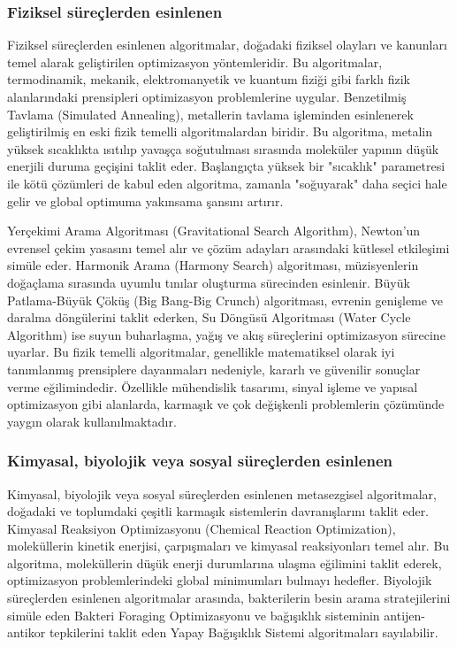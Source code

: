 \subsubsection{Fiziksel süreçlerden esinlenen}

Fiziksel süreçlerden esinlenen algoritmalar, doğadaki fiziksel olayları ve kanunları temel alarak geliştirilen optimizasyon yöntemleridir. Bu algoritmalar, termodinamik, mekanik, elektromanyetik ve kuantum fiziği gibi farklı fizik alanlarındaki prensipleri optimizasyon problemlerine uygular. Benzetilmiş Tavlama (Simulated Annealing), metallerin tavlama işleminden esinlenerek geliştirilmiş en eski fizik temelli algoritmalardan biridir. Bu algoritma, metalin yüksek sıcaklıkta ısıtılıp yavaşça soğutulması sırasında moleküler yapının düşük enerjili duruma geçişini taklit eder. Başlangıçta yüksek bir "sıcaklık" parametresi ile kötü çözümleri de kabul eden algoritma, zamanla "soğuyarak" daha seçici hale gelir ve global optimuma yakınsama şansını artırır.

Yerçekimi Arama Algoritması (Gravitational Search Algorithm), Newton'un evrensel çekim yasasını temel alır ve çözüm adayları arasındaki kütlesel etkileşimi simüle eder. Harmonik Arama (Harmony Search) algoritması, müzisyenlerin doğaçlama sırasında uyumlu tınılar oluşturma sürecinden esinlenir. Büyük Patlama-Büyük Çöküş (Big Bang-Big Crunch) algoritması, evrenin genişleme ve daralma döngülerini taklit ederken, Su Döngüsü Algoritması (Water Cycle Algorithm) ise suyun buharlaşma, yağış ve akış süreçlerini optimizasyon sürecine uyarlar. Bu fizik temelli algoritmalar, genellikle matematiksel olarak iyi tanımlanmış prensiplere dayanmaları nedeniyle, kararlı ve güvenilir sonuçlar verme eğilimindedir. Özellikle mühendislik tasarımı, sinyal işleme ve yapısal optimizasyon gibi alanlarda, karmaşık ve çok değişkenli problemlerin çözümünde yaygın olarak kullanılmaktadır.

\subsubsection{Kimyasal, biyolojik veya sosyal süreçlerden esinlenen}

Kimyasal, biyolojik veya sosyal süreçlerden esinlenen metasezgisel algoritmalar, doğadaki ve toplumdaki çeşitli karmaşık sistemlerin davranışlarını taklit eder. Kimyasal Reaksiyon Optimizasyonu (Chemical Reaction Optimization), moleküllerin kinetik enerjisi, çarpışmaları ve kimyasal reaksiyonları temel alır. Bu algoritma, moleküllerin düşük enerji durumlarına ulaşma eğilimini taklit ederek, optimizasyon problemlerindeki global minimumları bulmayı hedefler. Biyolojik süreçlerden esinlenen algoritmalar arasında, bakterilerin besin arama stratejilerini simüle eden Bakteri Foraging Optimizasyonu ve bağışıklık sisteminin antijen-antikor tepkilerini taklit eden Yapay Bağışıklık Sistemi algoritmaları sayılabilir.

